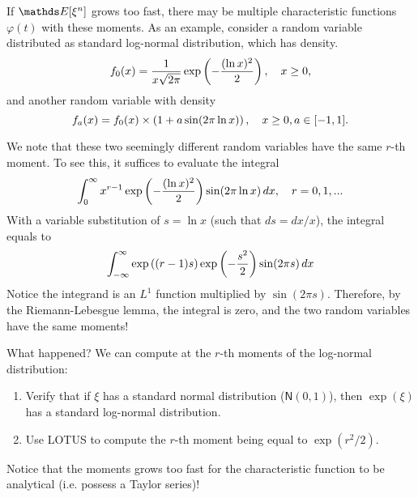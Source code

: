 \begin{example}
If $\E[\xi^n]$ grows too fast, there may be multiple characteristic functions $\varphi(t)$ with these moments. As an example, consider a random variable distributed as standard log-normal distribution, which has density.
\begin{equation}
    f_0(x) = \frac{1}{x\sqrt{2\pi}} \exp\left( -\frac{(\ln x)^2}{2} \right), \quad x \geq 0,
\end{equation}
and another random variable with density
\begin{equation}
    f_a(x) = f_0(x) \times \left( 1+a \sin (2\pi \ln x) \right), \quad x \geq 0, a \in [-1,1].
\end{equation}

\begin{center}
    
\end{center}

We note that these two seemingly different random variables have the same $r$-th moment. To see this, it suffices to evaluate the integral
\begin{equation*}
    \int_0^\infty x^{r-1} \exp\left( -\frac{(\ln x)^2}{2} \right) \sin(2\pi \ln x) \, dx, \quad r = 0,1,...
\end{equation*}
With a variable substitution of $s = \ln x$ (such that $ds = dx/x$), the integral equals to 
\begin{equation*}
    \int_{-\infty}^\infty \exp\left( (r-1)s \right) \exp\left( -\frac{s^2}{2} \right) \sin(2\pi s) \, dx
\end{equation*}
Notice the integrand is an $L^1$ function multiplied by $\sin(2\pi s)$. Therefore,  by the Riemann-Lebesgue lemma, the integral is zero, and the two random variables have the same moments!
\end{example}

\begin{exercise} What happened? We can compute at the $r$-th moments of the log-normal distribution:
\begin{enumerate}
\item Verify that if $\xi$ has a standard normal distribution ($\mathsf{N}(0,1)$), then $\exp(\xi)$ has a standard log-normal distribution. 
\item Use LOTUS to compute the $r$-th moment being equal to $\exp(r^2/2)$.
\end{enumerate}
Notice that the moments grows too fast for the characteristic function to be analytical (i.e. possess a Taylor series)!
\end{exercise}

